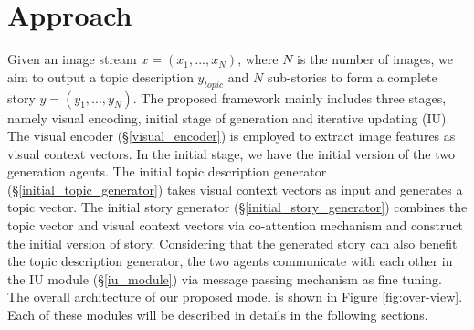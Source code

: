 \documentclass[11pt]{article}
\begin{document}
\section{Approach}
Given an image stream $x=(x_1,...,x_N)$, where $N$ is the number of images, we aim to output a topic description $y_{topic}$ and $N$ sub-stories to form a complete story $y=(y_1,...,y_N)$. The proposed framework mainly includes three stages, namely visual encoding, initial stage of generation and iterative updating (IU). The visual encoder (\S \ref{visual_encoder}) is employed to extract image features as visual context vectors. In the initial stage, we have the initial version of the two generation agents. The initial topic description generator (\S \ref{initial_topic_generator}) takes visual context vectors as input and generates a topic vector. The initial story generator (\S \ref{initial_story_generator}) combines the topic vector and visual context vectors via co-attention mechanism and construct the initial version of story. Considering that the generated story can also benefit the topic description generator, the two agents communicate with each other in the IU module (\S \ref{iu_module}) via message passing mechanism as fine tuning. The overall architecture of our proposed model is shown in Figure \ref{fig:over-view}. 
Each of these modules will be described in details in the following sections.
\end{document}
